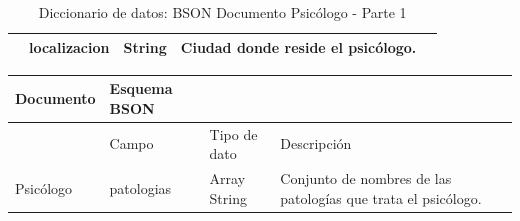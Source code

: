 \begin{table}[htpb]
\begin{tabularx}{\textwidth}{|l|X|X|X|X|}
                   & localizacion                                                                                                                                           & String                                                                                                                     & Ciudad donde reside el psicólogo.                                                                                                                                                                                                                                            \\ \hline
\end{tabularx}
\caption{Diccionario de datos: BSON Documento Psicólogo - Parte 1}
\label{fig:dic_datos_BSON_4}
\end{table}

\begin{table}[htpb]
\centering
\begin{tabularx}{\textwidth}{|l|X|X|X|X|}
\hline
Documento          & Esquema BSON                                                                                                                                           &                                                                                                                            &                                                                                                                                                                                                                                                                             \\ \hline
                   & Campo                                                                                                                                                  & Tipo de dato                                                                                                               & Descripción                                                                                                                                                                                                                                                                 \\ \hline
Psicólogo         & patologias                                                                                                                                             & Array String                                                                                                               & Conjunto de nombres de las patologías que trata el psicólogo.                                                                                                                                                                                                               

\end{tabularx}
\end{table}
